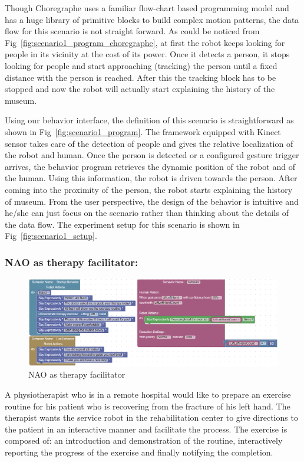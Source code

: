 \documentclass{llncs}
\begin{document}
	Though Choregraphe uses a familiar flow-chart based programming model and has a huge library of primitive blocks to build complex motion patterns, the data flow for this scenario is not straight forward. As could be noticed from Fig~\ref{fig:scenario1_program_choregraphe}, at first the robot keeps looking for people in its vicinity at the cost of its power. Once it detects a person, it stops looking for people and start approaching (tracking) the person until a fixed distance with the person is reached. After this the tracking block has to be stopped and now the robot will actually start explaining the history of the museum.
	
	Using our behavior interface, the definition of this scenario is straightforward as shown in Fig~\ref{fig:scenario1_program}. The framework equipped with Kinect sensor takes care of the detection of people and gives the relative localization of the robot and human. Once the person is detected or a configured gesture trigger arrives, the behavior program retrieves the dynamic position of the robot and of the human. Using this information, the robot is driven towards the person. After coming into the proximity of the person, the robot starts explaining the history of museum. From the user perspective, the design of the behavior is intuitive and he/she can just focus on the scenario rather than thinking about the details of the data flow. The experiment setup for this scenario is shown in Fig~\ref{fig:scenario1_setup}.
\subsubsection{NAO as therapy facilitator:}%
\begin{figure}
\includegraphics[width=\textwidth]{../thesis/assets/scenario2_horizontal.png}
\caption[NAO as therapy facilitator]{NAO as therapy facilitator}
\label{fig:scenario2_program}
\end{figure}
	A physiotherapist who is in a remote hospital would like to prepare an exercise routine for his patient who is recovering from the fracture of his left hand. The therapist wants the service robot in the rehabilitation center to give directions to the patient in an interactive manner and facilitate the process. The exercise is composed of: an introduction and demonstration of the routine, interactively reporting the progress of the exercise and finally notifying the completion. 
	
\end{document}
